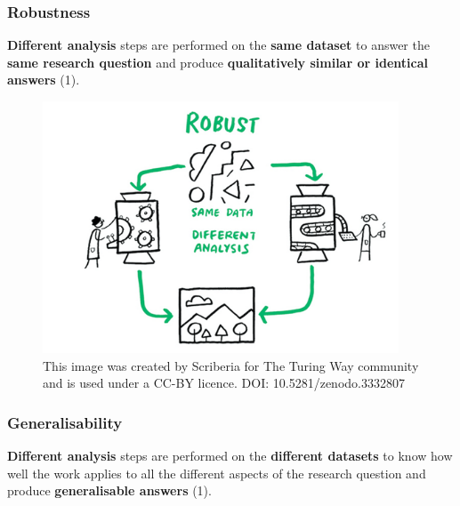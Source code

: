 \documentclass[
  letterpaper,
  DIV=11,
  numbers=noendperiod]{scrreprt}
\begin{document}
\hypertarget{robustness}{%
\subsubsection{Robustness}\label{robustness}}

\textbf{Different analysis} steps are performed on the \textbf{same
dataset} to answer the \textbf{same research question} and produce
\textbf{qualitatively similar or identical answers} (1).

\begin{figure}

{\centering \includegraphics[width=4.16667in,height=\textheight]{./images/paste-1E28AEDC.png}

}

\caption{\label{fig-robustness}This image was created by Scriberia for
The Turing Way community and is used under a CC-BY licence. DOI:
10.5281/zenodo.3332807}

\end{figure}

\hypertarget{generalisability}{%
\subsubsection{Generalisability}\label{generalisability}}

\textbf{Different analysis} steps are performed on the \textbf{different
datasets} to know how well the work applies to all the different aspects
of the research question and produce \textbf{generalisable answers} (1).
\end{document}
